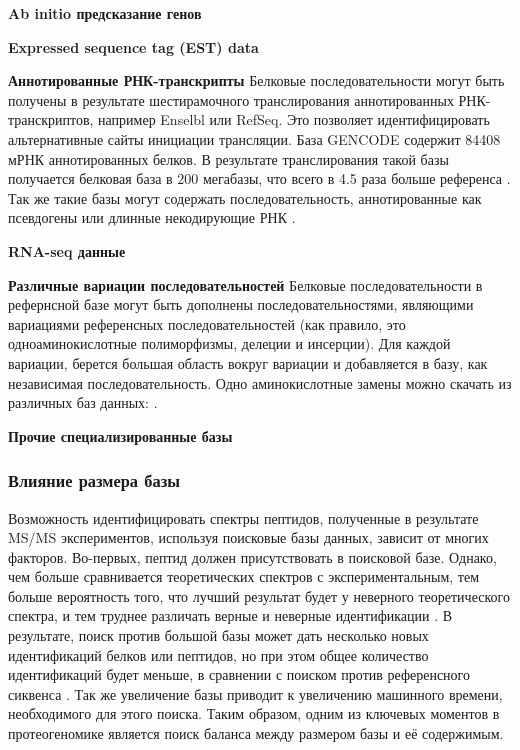 \textbf{Ab initio предсказание генов} 

\textbf{Expressed sequence tag (EST) data}

\textbf{Аннотированные РНК-транскрипты} Белковые последовательности могут быть получены в результате шестирамочного транслирования аннотированных РНК-транскриптов, например Enselbl или RefSeq. Это позволяет идентифицировать альтернативные сайты инициации трансляции. База GENCODE содержит 84408 мРНК аннотированных белков. В результате транслирования такой базы получается белковая база в 200 мегабазы, что всего в 4.5 раза больше референса \cite{khatun2013whole}. Так же такие базы могут содержать последовательность, аннотированные как псевдогены или длинные некодирующие РНК \cite{derrien2012gencode}.

\textbf{RNA-seq данные}

\textbf{Различные вариации последовательностей} Белковые последовательности в рефернсной базе могут быть дополнены последовательностями, являющими вариациями референсных последовательностей (как правило, это одноаминокислотные полиморфизмы, делеции и инсерции). Для каждой вариации, берется большая область вокруг вариации и добавляется в базу, как независимая последовательность. Одно аминокислотные замены можно скачать из различных баз данных:  \cite{li2011bioinformatics}.  

\textbf{Прочие специализированные базы}

\subsubsection{Влияние размера базы}
Возможность идентифицировать спектры пептидов, полученные в результате MS/MS экспериментов, используя поисковые базы данных, зависит от многих факторов. Во-первых, пептид должен присутствовать в поисковой базе. Однако, чем больше сравнивается теоретических спектров с экспериментальным, тем больше вероятность того, что лучший результат будет у неверного теоретического спектра, и тем труднее различать верные и неверные идентификации \cite{nesvizhskii2010survey}. В результате, поиск против большой базы может дать несколько новых идентификаций белков или пептидов, но при этом общее количество идентификаций будет меньше, в сравнении с поиском против референсного сиквенса \cite{blakeley2012addressing, krug2013deep}. Так же увеличение базы приводит к увеличению машинного времени, необходимого для этого поиска. Таким образом, одним из ключевых моментов в протеогеномике является поиск баланса между размером базы и её содержимым.

